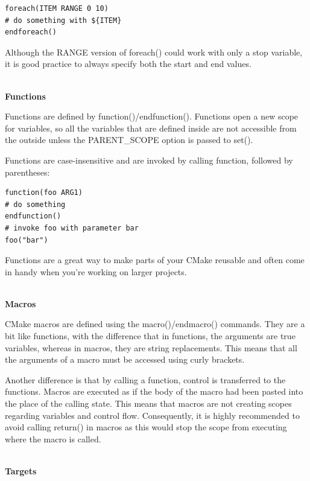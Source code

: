 \begin{lstlisting}[style=styleCMake]
foreach(ITEM RANGE 0 10)
# do something with ${ITEM}
endforeach()
\end{lstlisting}

Although the RANGE version of foreach() could work with only a stop variable, it is good practice to always specify both the start and end values.

\hspace*{\fill} \\ %
\noindent
\textbf{Functions}

Functions are defined by function()/endfunction(). Functions open a new scope for variables, so all the variables that are defined inside are not accessible from the outside unless the PARENT\_SCOPE option is passed to set().

Functions are case-insensitive and are invoked by calling function, followed by parentheses:

\begin{lstlisting}[style=styleCMake]
function(foo ARG1)
# do something
endfunction()
# invoke foo with parameter bar
foo("bar")
\end{lstlisting}

Functions are a great way to make parts of your CMake reusable and often come in handy when you're working on larger projects.

\hspace*{\fill} \\ %
\noindent
\textbf{Macros}

CMake macros are defined using the macro()/endmacro() commands. They are a
bit like functions, with the difference that in functions, the arguments are true variables, whereas in macros, they are string replacements. This means that all the arguments of a macro must be accessed using curly brackets.

Another difference is that by calling a function, control is transferred to the functions. Macros are executed as if the body of the macro had been pasted into the place of the calling state. This means that macros are not creating scopes regarding variables and control flow. Consequently, it is highly recommended to avoid calling return() in macros as this would stop the scope from executing where the macro is called.

\hspace*{\fill} \\ %
\noindent
\textbf{Targets}


